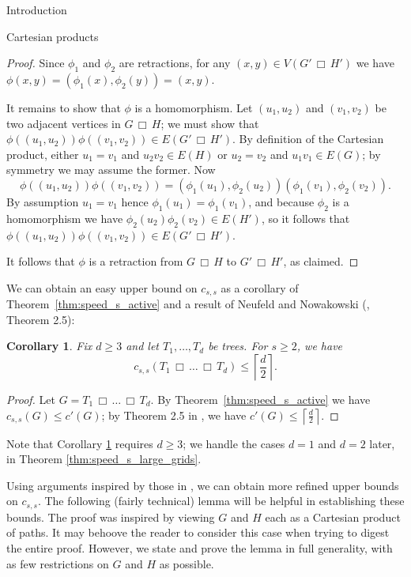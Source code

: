 \documentclass[12pt]{amsart}
\newcommand{\ceil}[1]{\ensuremath{\left\lceil #1\right\rceil} }
\newtheorem{corollary}[lemma]{Corollary}
\theoremstyle{definition}
\def\cart{\, \Box \,}
\newcommand{\speeds}{c_{s,s}}
\newcommand{\speed}[1]{c_{#1,#1}}
\begin{document}
\begin{section}{Introduction}
\begin{section}{Cartesian products}
\begin{proof}
Since $\phi_1$ and $\phi_2$ are retractions, for any $(x,y)\in V(G'\cart H')$ we have $\phi(x,y)=\left(\phi_1(x),\phi_2(y)\right)=(x,y)$.

It remains to show that $\phi$ is a homomorphism.  Let $(u_1,u_2)$ and $(v_1,v_2)$ be two adjacent vertices in $G\cart H$; we must show that $\phi((u_1,u_2))\phi((v_1,v_2)) \in E(G' \cart H')$.  By definition of the Cartesian product, either $u_1=v_1$ and $u_2v_2\in E(H)$ or $u_2=v_2$ and $u_1v_1\in E(G)$; by symmetry we may assume the former.  Now
\[\phi((u_1,u_2))\phi((v_1,v_2)) = \left(\phi_1(u_1),\phi_2(u_2)\right)\left(\phi_1(v_1),\phi_2(v_2)\right).\]
By assumption $u_1 = v_1$ hence $\phi_1(u_1) = \phi_1(v_1)$, and because $\phi_2$ is a homomorphism we have $\phi_2(u_2)\phi_2(v_2)\in E(H')$, so it follows that $\phi((u_1,u_2))\phi((v_1,v_2))\in E(G'\cart H')$.

It follows that $\phi$ is a retraction from $G \cart H$ to $G' \cart H'$, as claimed.
\end{proof}

We can obtain an easy upper bound on $\speed{s}$ as a corollary of Theorem~\ref{thm:speed_s_active} and a result of Neufeld and Nowakowski (\cite{NN98}, Theorem 2.5):
\begin{corollary}\label{cor:cartesian_product_trees_upper}
Fix $d \ge 3$ and let $T_1, \dots, T_d$ be trees.  For $s \ge 2$, we have
$$\speed{s}(T_1 \cart \dots \cart T_d) \le \ceil{\frac{d}{2}}.$$
\end{corollary}
\begin{proof}
Let $G = T_1 \cart \dots \cart T_d$.  By Theorem~\ref{thm:speed_s_active} we have $\speed{s}(G) \le c'(G)$; by Theorem 2.5 in \cite{NN98}, we have $c'(G) \le \ceil{\frac{d}{2}}$.
\end{proof}
Note that Corollary \ref{cor:cartesian_product_trees_upper} requires $d \ge 3$; we handle the cases $d=1$ and $d=2$ later, in Theorem \ref{thm:speed_s_large_grids}. 

Using arguments inspired by those in \cite{NN98}, we can obtain more refined upper bounds on $\speeds$.  The following (fairly technical) lemma will be helpful in establishing these bounds.  The proof was inspired by viewing $G$ and $H$ each as a Cartesian product of paths.  It may behoove the reader to consider this case when trying to digest the entire proof.  However, we state and prove the lemma in full generality, with as few restrictions on $G$ and $H$ as possible.


\end{section}
\end{section}
\end{document}
